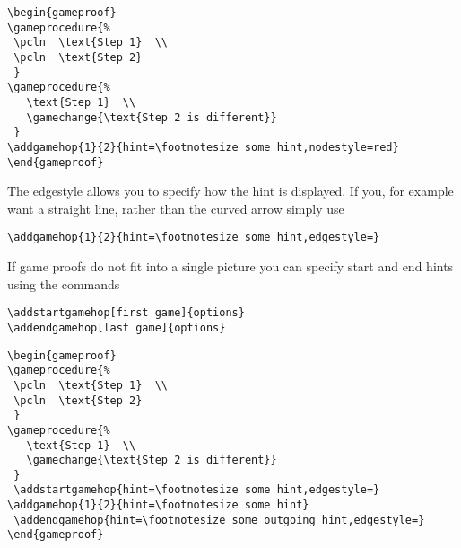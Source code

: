 \documentclass[a4paper]{report}
\begin{document}
\vspace{1ex}
\begin{center}
\begin{gameproof}
\end{gameproof}
\end{center}
\begin{lstlisting}
\begin{gameproof}
\gameprocedure{%
 \pcln  \text{Step 1}  \\
 \pcln  \text{Step 2}
 }
\gameprocedure{%
   \text{Step 1}  \\
   \gamechange{\text{Step 2 is different}}
 }
\addgamehop{1}{2}{hint=\footnotesize some hint,nodestyle=red}
\end{gameproof}
\end{lstlisting}
The edgestyle allows you to specify how the hint is displayed. If you, for example want a straight line, rather than the curved arrow simply
use
\begin{lstlisting}
\addgamehop{1}{2}{hint=\footnotesize some hint,edgestyle=}
\end{lstlisting}



If game proofs do not fit into a single picture you can specify start and end hints using the commands
\begin{lstlisting}
\addstartgamehop[first game]{options}
\addendgamehop[last game]{options}
\end{lstlisting}

\begin{center}
\begin{gameproof}
\end{gameproof}
\end{center}


\begin{lstlisting}
\begin{gameproof}
\gameprocedure{%
 \pcln  \text{Step 1}  \\
 \pcln  \text{Step 2}
 }
\gameprocedure{%
   \text{Step 1}  \\
   \gamechange{\text{Step 2 is different}}
 }
 \addstartgamehop{hint=\footnotesize some hint,edgestyle=}
\addgamehop{1}{2}{hint=\footnotesize some hint}
 \addendgamehop{hint=\footnotesize some outgoing hint,edgestyle=}
\end{gameproof}
\end{lstlisting}
\end{document}
